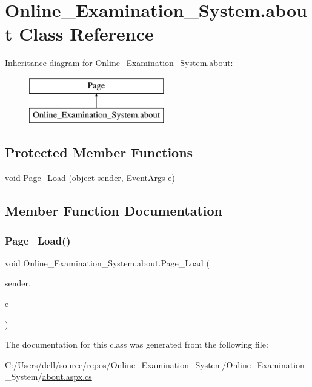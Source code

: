 \hypertarget{class_online___examination___system_1_1about}{}\section{Online\+\_\+\+Examination\+\_\+\+System.\+about Class Reference}
\label{class_online___examination___system_1_1about}
Inheritance diagram for Online\+\_\+\+Examination\+\_\+\+System.\+about\+:\begin{figure}[H]
\begin{center}
\leavevmode
\includegraphics[height=2.000000cm]{class_online___examination___system_1_1about}
\end{center}
\end{figure}
\subsection*{Protected Member Functions}
\begin{DoxyCompactItemize}
\item 
void \mbox{\hyperlink{class_online___examination___system_1_1about_a9643b140155dabeaf94afd85b7ed2aff}{Page\+\_\+\+Load}} (object sender, Event\+Args e)
\end{DoxyCompactItemize}


\subsection{Member Function Documentation}
\mbox{\label{class_online___examination___system_1_1about_a9643b140155dabeaf94afd85b7ed2aff}} 
\subsubsection{\texorpdfstring{Page\_Load()}{Page\_Load()}}
{\footnotesize\ttfamily void Online\+\_\+\+Examination\+\_\+\+System.\+about.\+Page\+\_\+\+Load (\begin{DoxyParamCaption}\item[{object}]{sender,  }\item[{Event\+Args}]{e }\end{DoxyParamCaption})\hspace{0.3cm}{\ttfamily [protected]}}



The documentation for this class was generated from the following file\+:\begin{DoxyCompactItemize}
\item 
C\+:/\+Users/dell/source/repos/\+Online\+\_\+\+Examination\+\_\+\+System/\+Online\+\_\+\+Examination\+\_\+\+System/\mbox{\hyperlink{about_8aspx_8cs}{about.\+aspx.\+cs}}\end{DoxyCompactItemize}
